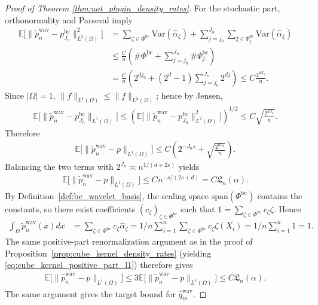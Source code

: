 \documentclass[11pt,reqno]{amsart}
\theoremstyle{definition}
\renewcommand{\hat}{\widehat}
\renewcommand{\tilde}{\widetilde}
\newcommand{\Ep}{\mathbb{E}}
\begin{document}
\begin{proof}[Proof of Theorem \ref{thm:uot_plugin_density_rates}]
For the stochastic part, orthonormality and Parseval imply
\begin{align*}
    \Ep\bigl[\|\tilde p_n^{\mathrm{wav}}-p_{J_n}^{\mathrm{bc}}\|_{L^2(\Omega)}^2\bigr]
    &= \sum_{\zeta\in\Phi^{\mathrm{bc}}}\mathrm{Var}(\hat\alpha_\zeta)
    + \sum_{j=j_0}^{J_n}\sum_{\xi\in\Psi_j^{\mathrm{bc}}}\mathrm{Var}(\hat\alpha_\xi) \\
    &\le \frac{C}{n}\left(\#\Phi^{\mathrm{bc}} + \sum_{j=j_0}^{J_n}\#\Psi_j^{\mathrm{bc}}\right) \\
    &= \frac{C}{n}\left(2^{dj_0} + (2^d-1)\sum_{j=j_0}^{J_n}2^{dj}\right)
    \le C\frac{2^{dJ_n}}{n}.
\end{align*}
Since $|\Omega|=1$, $\|f\|_{L^1(\Omega)}\le \|f\|_{L^2(\Omega)}$; hence by Jensen,
\begin{align*}
    \Ep\bigl[\|\tilde p_n^{\mathrm{wav}}-p_{J_n}^{\mathrm{bc}}\|_{L^1(\Omega)}\bigr]
    \le
    \left(\Ep\bigl[\|\tilde p_n^{\mathrm{wav}}-p_{J_n}^{\mathrm{bc}}\|_{L^2(\Omega)}^2\bigr]\right)^{1/2}
    \le C\sqrt{\frac{2^{dJ_n}}{n}}.
\end{align*}
Therefore
\begin{align*}
    \Ep\bigl[\|\tilde p_n^{\mathrm{wav}}-p\|_{L^1(\Omega)}\bigr]
    \le C\left(2^{-J_ns}+\sqrt{\frac{2^{dJ_n}}{n}}\right).
\end{align*}
Balancing the two terms with $2^{J_n}\asymp n^{1/(d+2s)}$ yields
\begin{align*}
    \Ep\bigl[\|\tilde p_n^{\mathrm{wav}}-p\|_{L^1(\Omega)}\bigr]
    \le Cn^{{-s/(2s+d)}} = C\mathfrak L_n(\alpha).
\end{align*}
By Definition~\ref{def:bc_wavelet_basis}, the scaling space $\mathrm{span}(\Phi^{\mathrm{bc}})$ contains the constants, so there exist coefficients $(c_\zeta)_{\zeta\in\Phi^{\mathrm{bc}}}$ such that $1=\sum_{\zeta\in\Phi^{\mathrm{bc}}}c_\zeta\zeta$. Hence
\begin{align*}
    \int_{\Omega}\tilde p_n^{\mathrm{wav}}(x) dx
    &= \sum_{\zeta\in\Phi^{\mathrm{bc}}} c_\zeta\hat\alpha_\zeta
    = {1/n}\sum_{i=1}^n\sum_{\zeta\in\Phi^{\mathrm{bc}}}c_\zeta\zeta(X_i)
    = {1/n}\sum_{i=1}^n 1 = 1.
\end{align*}
The same positive-part renormalization argument as in the proof of Proposition~\ref{prop:cube_kernel_density_rates} (yielding \eqref{eq:cube_kernel_positive_part_l1}) therefore gives
\begin{align*}
    \Ep\bigl[\|\hat p_n^{\mathrm{wav}}-p\|_{L^1(\Omega)}\bigr]
    \le 3\Ep\bigl[\|\tilde p_n^{\mathrm{wav}}-p\|_{L^1(\Omega)}\bigr]
    \le C\mathfrak L_n(\alpha).
\end{align*}
The same argument gives the target bound for $\hat q_m^{\mathrm{wav}}$.


\end{proof}
\end{document}
